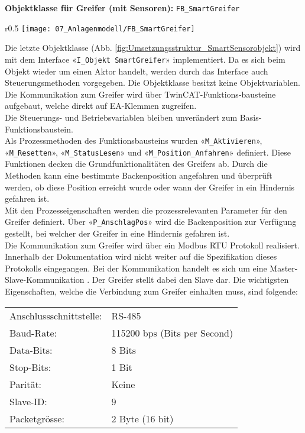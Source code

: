		\newpage
		
		\textbf{Objektklasse für Greifer (mit Sensoren):} \verb|FB_SmartGreifer|
		\vspace{2mm}
		\vspace{-10mm}  
		\\
		\begin{wrapfigure}{r}{0.5\textwidth}
			\centering
			\texttt{[image: 07\_Anlagenmodell/FB\_SmartGreifer]}
			\captionsetup{justification=centering}
			\caption{Umsetzungsstruktur von Greifer-Objekt}
			\label{fig:Umsetzungsstruktur_SmartSensorobjekt}
		\end{wrapfigure} \par
		Die letzte Objektklasse (Abb. \ref{fig:Umsetzungsstruktur_SmartSensorobjekt}) wird mit dem Interface «\verb|I_Objekt SmartGreifer|» implementiert. Da es sich beim Objekt wieder um einen Aktor handelt, werden durch das Interface auch Steuerungsmethoden vorgegeben. Die Objektklasse besitzt keine Objektvariablen. Die Kommunikation zum Greifer wird über TwinCAT-Funktions-bausteine aufgebaut, welche direkt auf EA-Klemmen zugreifen. 
		\\
		Die Steuerungs- und Betriebsvariablen bleiben unverändert zum Basis-Funktionsbaustein.
		\\
		Als Prozessmethoden des Funktionsbausteins wurden «\verb|M_Aktivieren|», «\verb|M_Resetten|», «\verb|M_StatusLesen|» und «\verb|M_Position_Anfahren|» definiert. Diese Funktionen decken die Grundfunktionalitäten des Greifers ab. Durch die Methoden kann eine bestimmte Backenposition angefahren und überprüft werden, ob diese Position erreicht wurde oder wann der Greifer in ein Hindernis gefahren ist.
		\\
		Mit den Prozesseigenschaften werden die prozessrelevanten Parameter für den Greifer definiert. Über «\verb|P_AnschlagPos|»  wird die Backenposition zur Verfügung gestellt, bei welcher der Greifer in eine Hindernis gefahren ist. 
		\\
		Die Kommunikation zum Greifer wird über ein Modbus RTU Protokoll realisiert. Innerhalb der Dokumentation wird nicht weiter auf die Spezifikation dieses Protokolls eingegangen. Bei der Kommunikation handelt es sich um eine Master-Slave-Kommunikation \cite{2F-85}. Der Greifer stellt dabei den Slave dar. Die wichtigsten Eigenschaften, welche die Verbindung zum Greifer einhalten muss, sind folgende:
		
		\begin{tabularx}{\textwidth}{@{}>{}p{13em} X@{}}
			Anschlussschnittstelle: & 
			RS-485
			\\
			Baud-Rate: & 
			115200 bps (Bits per Second)
			\\
			Data-Bits: & 
			8 Bits 
			\\
			Stop-Bits: & 
			1 Bit 
			\\
			Parität: & 
			Keine
			\\
			Slave-ID: & 
			9
			\\
			Packetgrösse: & 
			2 Byte (16 bit)
			\\
		\end{tabularx} \vspace{3mm} 
		
